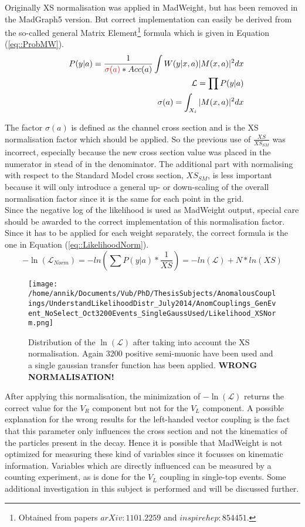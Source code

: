 Originally XS normalisation was applied in MadWeight, but has been removed in the MadGraph5 version. But correct implementation can easily be derived from the so-called general Matrix Element\footnote{Obtained from papers $arXiv:1101.2259$ and $inspirehep:854451$.} formula which is given in Equation (\ref{eq::ProbMW}). 
\begin{eqnarray}
 & & P(y \vert a) = \frac{1}{\textcolor{red}{\sigma(a)}*Acc(a)} \int W(y|x,a) \vert M(x,a) \vert^{2} dx \label{eq::ProbMW}\\
 & & \mathcal{L} = \prod P(y \vert a) \\
 & &  \sigma(a) = \int_{X_i} \vert M(x,a) \vert^{2} dx
\end{eqnarray}

The factor $\sigma(a)$ is defined as the channel cross section and is the XS normalisation factor which should be applied. So the previous use of $\frac{XS}{XS_{SM}}$ was incorrect, especially because the new cross section value was placed in the numerator in stead of in the denominator. The additional part with normalising with respect to the Standard Model cross section, $XS_{SM}$, is less important because it will only introduce a general up- or down-scaling of the overall normalisation factor since it is the same for each point in the grid.\\
Since the negative log of the likelihood is used as MadWeight output, special care should be awarded to the correct implementation of this normalisation factor. Since it has to be applied for each weight separately, the correct formula is the one in Equation (\ref{eq::LikelihoodNorm}). 
\begin{equation}\label{eq::LikelihoodNorm}
 -\ln(\mathcal{L}_{Norm}) = - ln(\sum P(y \vert a)*\frac{1}{XS}) = -ln(\mathcal{L}) + N*ln(XS)
\end{equation}

\begin{figure}[!h]
 \texttt{[image: /home/annik/Documents/Vub/PhD/ThesisSubjects/AnomalousCouplings/UnderstandLikelihoodDistr\_July2014/AnomCouplings\_GenEvent\_NoSelect\_Oct3200Events\_SingleGaussUsed/Likelihood\_XSNorm.png]}
 \caption{Distribution of the $\ln(\mathcal{L})$ after taking into account the XS normalisation. Again 3200 positive semi-muonic have been used and a single gaussian transfer function has been applied. \textbf{WRONG NORMALISATION!}}
 \label{fig::LikelihoodNorm}
\end{figure}

After applying this normalisation, the minimization of $-\ln(\mathcal{L})$ returns the correct value for the $V_R$ component but not for the $V_L$ component. A possible explanation for the wrong results for the left-handed vector coupling is the fact that this parameter only influences the cross section and not the kinematics of the particles present in the decay. Hence it is possible that MadWeight is not optimized for measuring these kind of variables since it focusses on kinematic information. Variables which are directly influenced can be measured by a counting experiment, as is done for the $V_L$ coupling in single-top events. Some additional investigation in this subject is performed and will be discussed further.

